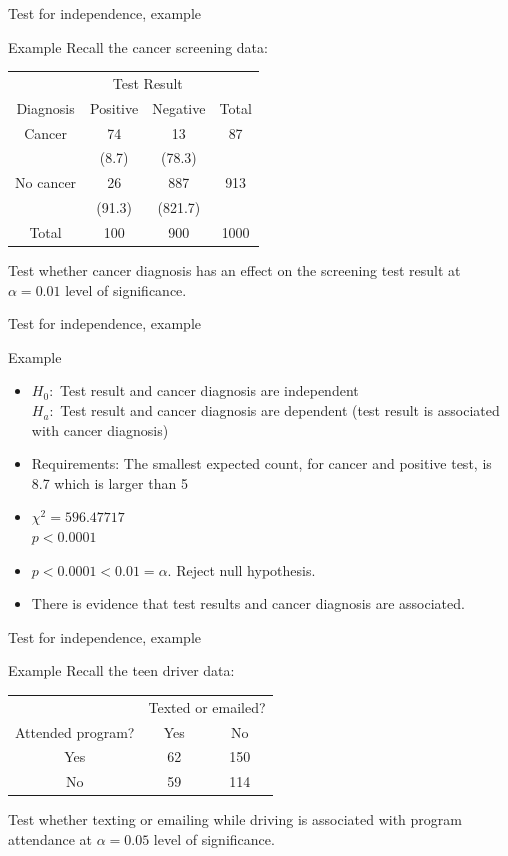 \documentclass[xcolor=table, aspectratio=169, bigger]{beamer}
\begin{document}
\begin{frame}{Test for independence, example}
\begin{exampleblock}{Example}
Recall the cancer screening data:\\
\smallskip
{\centering
\begin{tabular}{c | c  c | c}
\multicolumn{1}{c}{} & \multicolumn{2}{c}{Test Result}\\
Diagnosis & Positive & Negative & Total\\
\hline
Cancer & 74 & 13 & 87\\
& (8.7) & (78.3)\\
No cancer & 26 & 887 & 913 \\
& (91.3) & (821.7)\\
\hline
Total & 100 & 900 & 1000
\end{tabular}
\par}
\bigskip
Test whether cancer diagnosis has an effect on the screening test result at $\alpha = 0.01$ level of significance.
\end{exampleblock}
\end{frame}

\begin{frame}{Test for independence, example}
\begin{exampleblock}{Example}
\begin{itemize}
\pause\item $H_0:$ Test result and cancer diagnosis are independent\\
$H_a:$ Test result and cancer diagnosis are dependent (test result is associated with cancer diagnosis)
\pause\item Requirements: The smallest expected count, for cancer and positive test, is 8.7 which is larger than 5
\pause\item $\chi^2 = 596.47717$\\
$p < 0.0001 $
\pause\item $p < 0.0001 < 0.01 = \alpha$. Reject null hypothesis.
\pause\item There is evidence that test results and cancer diagnosis are associated.
\end{itemize}
\end{exampleblock}
\end{frame}

\begin{frame}{Test for independence, example}
\begin{exampleblock}{Example}
Recall the teen driver data:\\
\medskip
{\centering
\begin{tabular}{c | c  c}
\multicolumn{1}{c}{} & \multicolumn{2}{c}{Texted or emailed?}\\
Attended program? & Yes & No\\
\hline
Yes & 62 & 150\\
No & 59 & 114 \\
\end{tabular}
\par}
\bigskip
Test whether texting or emailing while driving is associated with program attendance at $\alpha = 0.05$ level of significance.
\end{exampleblock}
\end{frame}
\end{document}
